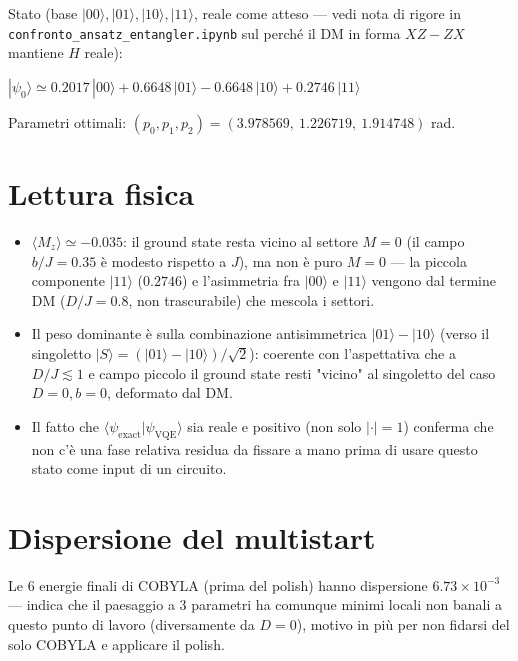 \documentclass[11pt,a4paper]{article}
\begin{document}
\medskip
\noindent Stato (base $|00\rangle,|01\rangle,|10\rangle,|11\rangle$,
reale come atteso --- vedi nota di rigore in
\texttt{confronto\_ansatz\_entangler.ipynb} sul perché il DM in forma
$XZ-ZX$ mantiene $H$ reale):

\begin{keyeq}
\centering
$|\psi_0\rangle \simeq 0.2017\,|00\rangle + 0.6648\,|01\rangle -
0.6648\,|10\rangle + 0.2746\,|11\rangle$
\end{keyeq}

\noindent Parametri ottimali: $(p_0,p_1,p_2) = (3.978569,\ 1.226719,\
1.914748)$ rad.

\section*{Lettura fisica}

\begin{itemize}[leftmargin=1.3em,itemsep=0.3em]
\item $\langle M_z\rangle\simeq-0.035$: il ground state resta vicino al
settore $M=0$ (il campo $b/J=0.35$ è modesto rispetto a $J$), ma non è
puro $M=0$ --- la piccola componente $|11\rangle$ ($0.2746$) e
l'asimmetria fra $|00\rangle$ e $|11\rangle$ vengono dal termine DM
($D/J=0.8$, non trascurabile) che mescola i settori.
\item Il peso dominante è sulla combinazione antisimmetrica
$|01\rangle-|10\rangle$ (verso il singoletto
$|S\rangle=(|01\rangle-|10\rangle)/\sqrt2$): coerente con l'aspettativa
che a $D/J\lesssim1$ e campo piccolo il ground state resti "vicino" al
singoletto del caso $D=0,b=0$, deformato dal DM.
\item Il fatto che $\langle\psi_\text{exact}|\psi_\text{VQE}\rangle$ sia
reale e positivo (non solo $|\cdot|=1$) conferma che non c'è una fase
relativa residua da fissare a mano prima di usare questo stato come
input di un circuito.
\end{itemize}

\section*{Dispersione del multistart}

Le 6 energie finali di COBYLA (prima del polish) hanno dispersione
$6.73\times10^{-3}$ --- indica che il paesaggio a 3 parametri ha
comunque minimi locali non banali a questo punto di lavoro (diversamente
da $D=0$), motivo in più per non fidarsi del solo COBYLA e applicare il
polish.
\end{document}

